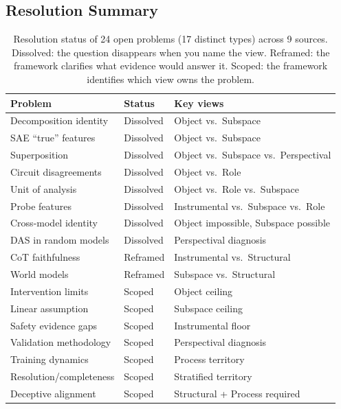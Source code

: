 \documentclass[11pt]{article}
\theoremstyle{remark}
\begin{document}
\subsection{Resolution Summary}

\begin{table}[ht]
\centering
\footnotesize
\begin{tabular}{lll}
\toprule
\textbf{Problem} & \textbf{Status} & \textbf{Key views} \\
\midrule
Decomposition identity & Dissolved & Object vs.\ Subspace \\
SAE ``true'' features & Dissolved & Object vs.\ Subspace \\
Superposition & Dissolved & Object vs.\ Subspace vs.\ Perspectival \\
Circuit disagreements & Dissolved & Object vs.\ Role \\
Unit of analysis & Dissolved & Object vs.\ Role vs.\ Subspace \\
Probe features & Dissolved & Instrumental vs.\ Subspace vs.\ Role \\
Cross-model identity & Dissolved & Object impossible, Subspace possible \\
DAS in random models & Dissolved & Perspectival diagnosis \\
CoT faithfulness & Reframed & Instrumental vs.\ Structural \\
World models & Reframed & Subspace vs.\ Structural \\
Intervention limits & Scoped & Object ceiling \\
Linear assumption & Scoped & Subspace ceiling \\
Safety evidence gaps & Scoped & Instrumental floor \\
Validation methodology & Scoped & Perspectival diagnosis \\
Training dynamics & Scoped & Process territory \\
Resolution/completeness & Scoped & Stratified territory \\
Deceptive alignment & Scoped & Structural + Process required \\
\bottomrule
\end{tabular}
\caption{Resolution status of 24 open problems (17 distinct types)
across 9 sources. Dissolved: the question disappears when you name the
view. Reframed: the framework clarifies what evidence would answer it.
Scoped: the framework identifies which view owns the problem.}
\label{tab:openprobs}
\end{table}
\end{document}
